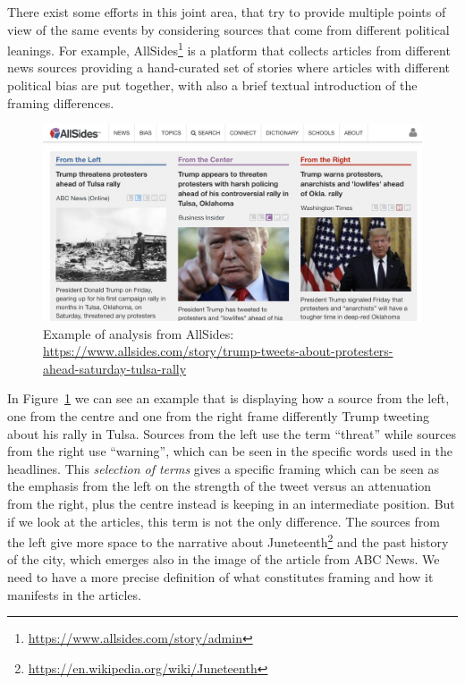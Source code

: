 There exist some efforts in this joint area, that try to provide multiple points of view of the same events by considering sources that come from different political leanings.
For example, AllSides\footnote{\url{https://www.allsides.com/story/admin}} is a platform that collects articles from different news sources providing a hand-curated set of stories where articles with different political bias are put together, with also a brief textual introduction of the framing differences.

\begin{figure}[!htb]
    \centering
    \includegraphics[width=\linewidth]{figures/allsides.png}
    \caption{Example of analysis from AllSides: \url{https://www.allsides.com/story/trump-tweets-about-protesters-ahead-saturday-tulsa-rally}}
    \label{fig:allsides}
\end{figure}

In Figure~\ref{fig:allsides} we can see an example that is displaying how a source from the left, one from the centre and one from the right frame differently Trump tweeting about his rally in Tulsa.
Sources from the left use the term ``threat'' while sources from the right use ``warning'', which can be seen in the specific words used in the headlines.
This \emph{selection of terms} gives a specific framing which can be seen as the emphasis from the left on the strength of the tweet versus an attenuation from the right, plus the centre instead is keeping in an intermediate position.
But if we look at the articles, this term is not the only difference. The sources from the left give more space to the narrative about Juneteenth\footnote{\url{https://en.wikipedia.org/wiki/Juneteenth}} and the past history of the city, which emerges also in the image of the article from ABC News.
We need to have a more precise definition of what constitutes framing and how it manifests in the articles.

